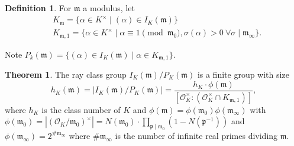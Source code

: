 \documentclass{article}
\theoremstyle{definition}
\newtheorem{theorem}{Theorem}[section]
\newtheorem{defn}{Definition}[section]
\begin{document}

\begin{defn}
    For $\mathfrak{m}$ a modulus, let 
    \begin{align*}
        &K_{\mathfrak{m}} = \{\alpha \in K^\times \mid (\alpha) \in I_K(\mathfrak{m})\}\\
        &K_{\mathfrak{m},1} = \{\alpha \in K^\times \mid  \alpha \equiv 1 \pmod{\mathfrak{m}_0}, \sigma(\alpha)>0 ~\forall \sigma \mid \mathfrak{m}_\infty\}.
    \end{align*}
\end{defn}
Note $P_k(\mathfrak{m}) = \{(\alpha) \in I_K(\mathfrak{m}) \mid  \alpha \in K_{\mathfrak{m},1}\}$.

\begin{theorem}
    The ray class group $I_K(\mathfrak{m})/P_K(\mathfrak{m})$ is a finite group with size \[
    h_K(\mathfrak{m}) = |I_K(\mathfrak{m})/P_K(\mathfrak{m})| = \frac{h_K \cdot \phi(\mathfrak{m})}{[\mathcal{O}_K^\times : (\mathcal{O}_K^\times \cap K_{\mathfrak{m},1})]},
    \]
    where $h_K$ is the class number of $K$ and $\phi(\mathfrak{m}) = \phi(\mathfrak{m}_0)\phi(\mathfrak{m}_{\infty})$ with $\phi(\mathfrak{m}_0) = |(\mathcal{O}_K/\mathfrak{m}_0)^\times| = N(\mathfrak{m}_0) \cdot \prod_{\mathfrak{p} \mid \mathfrak{m}_0}^{} (1-N(\mathfrak{p}^{-1}))$ and $\phi(\mathfrak{m}_{\infty}) = 2^{\# \mathfrak{m}_{\infty}}$ where $\# \mathfrak{m}_{\infty}$ is the number of infinite real primes dividing $\mathfrak{m}$.
\end{theorem}
\end{document}
